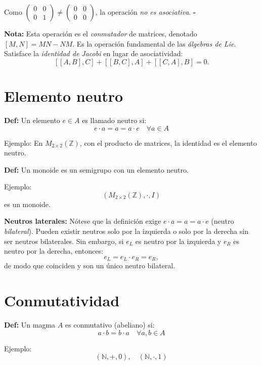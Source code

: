 \documentclass[12pt]{article}
\begin{document}
\begin{tcolorbox}[iabox]
Como $\begin{pmatrix}0&0\\0&1\end{pmatrix}\neq\begin{pmatrix}0&0\\0&0\end{pmatrix}$, la operación \emph{no es asociativa}. $\square$

\medskip
\textbf{Nota:} Esta operación es el \emph{conmutador} de matrices, denotado $[M,N]=MN-NM$. Es la operación fundamental de las \emph{álgebras de Lie}. Satisface la \emph{identidad de Jacobi} en lugar de asociatividad:
\[
  [[A,B],C]+[[B,C],A]+[[C,A],B]=0.
\]
\end{tcolorbox}

\section*{Elemento neutro}

\textbf{Def:} Un elemento $e\in A$ es llamado neutro si:
\[
e\cdot a=a=a\cdot e \quad \forall a\in A
\]

Ejemplo:
En $M_{2\times2}(\mathbb{Z})$, con el producto de matrices, la identidad es el elemento neutro.

\textbf{Def:} Un monoide es un semigrupo con un elemento neutro.

Ejemplo:
\[
(M_{2\times2}(\mathbb{Z}),\cdot,I)
\]
es un monoide.

\begin{tcolorbox}[iabox]
\textbf{Neutros laterales:} Nótese que la definición exige $e\cdot a = a = a\cdot e$ (neutro \emph{bilateral}). Pueden existir neutros solo por la izquierda o solo por la derecha sin ser neutros bilaterales. Sin embargo, si $e_L$ es neutro por la izquierda y $e_R$ es neutro por la derecha, entonces:
\[
  e_L = e_L \cdot e_R = e_R,
\]
de modo que coinciden y son un único neutro bilateral.
\end{tcolorbox}

\section*{Conmutatividad}

\textbf{Def:} Un magma $A$ es conmutativo (abeliano) si:
\[
a\cdot b=b\cdot a \quad \forall a,b\in A
\]

Ejemplo:
\[
(\mathbb{N},+,0), \quad (\mathbb{N},\cdot,1)
\]
\end{document}
